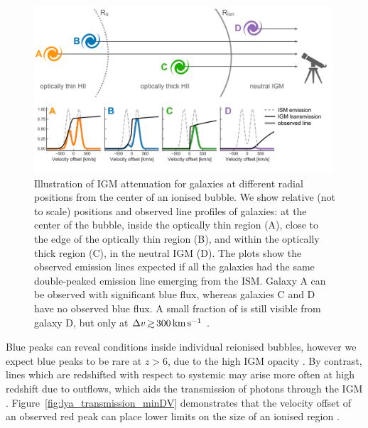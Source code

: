 \documentclass[fleqn,usenatbib]{mnras}
\begin{document}
\begin{figure}
    \includegraphics[width=0.99\textwidth]{figs/fig8.pdf}
    \caption{Illustration of IGM attenuation for galaxies at different radial positions from the center of an ionised bubble. We show relative (not to scale) positions and observed line profiles of galaxies: at the center of the bubble, inside the optically thin region (A), close to the edge of the optically thin region (B), and within the optically thick region (C), in the neutral IGM (D). The plots show the observed \lya emission lines expected if all the galaxies had the same double-peaked emission line emerging from the ISM. Galaxy A can be observed with significant blue flux, whereas galaxies C and D have no observed blue flux. A small fraction of \lya is still visible from galaxy D, but only at $\DV\simgt300\kms$ .}
    \label{fig:cartoon}
\end{figure}

Blue \lya peaks can reveal conditions inside individual reionised bubbles, however we expect blue peaks to be rare at $z>6$, due to the high IGM opacity \citep[see \S~\ref{sec:results_opticallythin} and e.g.,][]{Laursen2011} . By contrast, \lya lines which are redshifted with respect to systemic may arise more often at high redshift due to outflows, which aids the transmission of photons through the IGM \citep{Dijkstra2011}. Figure~\ref{fig:lya_transmission_minDV} demonstrates that the velocity offset of an observed red peak can place lower limits on the size of an ionised region \citep[see also][]{Malhotra2006}.
\end{document}
